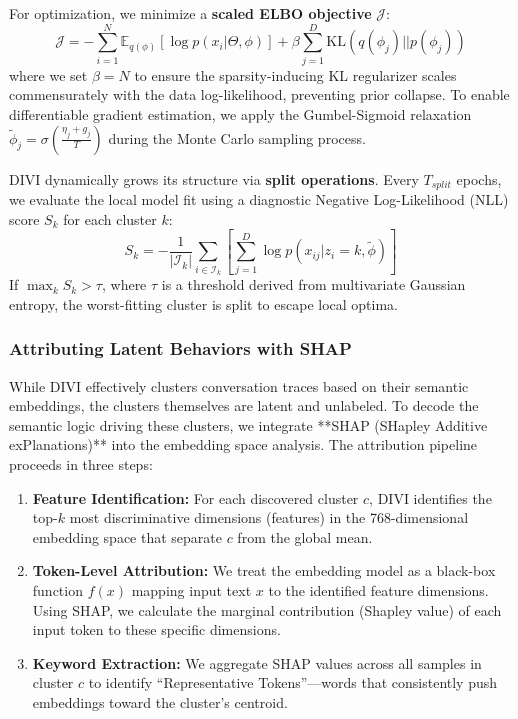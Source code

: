 \documentclass[conference]{IEEEtran}
\begin{document}
For optimization, we minimize a \textbf{scaled ELBO objective} $\mathcal{J}$\cite{anonymous2025divi}:
\begin{equation}
\mathcal{J} = -\sum_{i=1}^{N} \mathbb{E}_{q(\phi)}[\log p(x_i|\Theta, \phi)] + \beta \sum_{j=1}^{D} \text{KL}(q(\phi_j)||p(\phi_j))
\end{equation}
where we set $\beta = N$ to ensure the sparsity-inducing KL regularizer scales commensurately with the data log-likelihood, preventing prior collapse\cite{anonymous2025divi}. To enable differentiable gradient estimation, we apply the Gumbel-Sigmoid relaxation $\tilde{\phi}_j = \sigma(\frac{\eta_j + g_j}{T})$ during the Monte Carlo sampling process\cite{anonymous2025divi}.

DIVI dynamically grows its structure via \textbf{split operations}\cite{anonymous2025divi}. Every $T_{split}$ epochs, we evaluate the local model fit using a diagnostic Negative Log-Likelihood (NLL) score $S_k$ for each cluster $k$\cite{anonymous2025divi}:
\begin{equation}
S_k = -\frac{1}{|\mathcal{I}_k|}\sum_{i\in\mathcal{I}_k} \left[ \sum_{j=1}^{D} \log p(x_{ij}|z_i=k, \tilde{\phi}) \right]
\end{equation}
If $\max_k S_k > \tau$, where $\tau$ is a threshold derived from multivariate Gaussian entropy, the worst-fitting cluster is split to escape local optima\cite{anonymous2025divi}.

\subsubsection{Attributing Latent Behaviors with SHAP}
While DIVI effectively clusters conversation traces based on their semantic embeddings, the clusters themselves are latent and unlabeled. To decode the semantic logic driving these clusters, we integrate **SHAP (SHapley Additive exPlanations)** into the embedding space analysis.
The attribution pipeline proceeds in three steps:
\begin{enumerate}
    \item \textbf{Feature Identification:} For each discovered cluster $c$, DIVI identifies the top-$k$ most discriminative dimensions (features) in the 768-dimensional embedding space that separate $c$ from the global mean.
    \item \textbf{Token-Level Attribution:} We treat the embedding model as a black-box function $f(x)$ mapping input text $x$ to the identified feature dimensions. Using SHAP, we calculate the marginal contribution (Shapley value) of each input token to these specific dimensions.
    \item \textbf{Keyword Extraction:} We aggregate SHAP values across all samples in cluster $c$ to identify ``Representative Tokens''---words that consistently push embeddings toward the cluster's centroid.
\end{enumerate}
\end{document}
